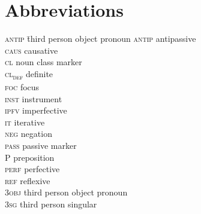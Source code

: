 \documentclass[output=paper]{langscibook}
\begin{document}





\section*{Abbreviations}
\begin{multicols}{2}
\begin{tabbing}
\textsc{antip}\hspace{.5cm} \= third person object pronoun\kill
\textsc{antip} \> antipassive\\
\textsc{caus} \> causative \\
\textsc{cl} \> noun class marker\\
\textsc{cl\textsubscript{def}} \> definite\\
\textsc{foc} \> focus\\
\textsc{inst} \> instrument\\
\textsc{ipfv} \> imperfective\\
\textsc{it} \> iterative\\
\textsc{neg} \> negation \\
\textsc{pass} \> passive marker \\
\textsc{P} \> preposition\\
\textsc{perf} \> perfective\\
\textsc{ref} \> reflexive \\
\textsc{3obj} \> third person object pronoun\\
\textsc{3sg} \>  third person singular
\end{tabbing}
\end{multicols}
 
\end{document}

